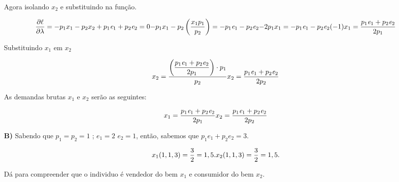\begin{flushleft}
\begin{center}
Agora isolando $x_{2}$ e substituindo na função.
\end{center}

\begin{equation}
\frac{\partial\ell}{\partial \lambda} = -p_{1}x_{1} - p_{2}x_{2} + p_{1}\textit{e}_{1} + p_{2}\textit{e}_{2} = 0
$$\\$$
-p_{1}x_{1} - p_{2}\left(\dfrac{x_{1}p_{1}}{p_{2}}\right) = -p_{1}\textit{e}_{1} - p_{2}\textit{e}_{2}
$$\\$$
-2p_{1}x_{1} = -p_{1}\textit{e}_{1} - p_{2}\textit{e}_{2} (-1)
$$\\$$
x_{1} = \dfrac{p_{1}\textit{e}_{1} + p_{2}\textit{e}_{2}}{2p_{1}}
\end{equation}

\begin{center}
Substituindo $x_{1}$ em $x_{2}$
\end{center}

\begin{equation}
x_{2} = \dfrac{\left( \dfrac{p_{1}\textit{e}_{1} + p_{2}\textit{e}_{2}}{2p_{1}}\right)\cdot p_{1}}{p_{2}}
$$\\$$
x_{2} = \dfrac{p_{1}\textit{e}_{1} + p_{2}\textit{e}_{2}}{2p_{2}}
\end{equation}

\begin{center}
As demandas brutas $x_{1}$ e $x_{2}$ serão as seguintes:

\begin{equation}
x_{1} = \dfrac{p_{1}\textit{e}_{1} + p_{2}\textit{e}_{2}}{2p_{1}}
$$\\$$
x_{2} = \dfrac{p_{1}\textit{e}_{1} + p_{2}\textit{e}_{2}}{2p_{2}}
\end{equation}

\end{center}

\singlespacing

\textbf{B)} Sabendo que $p_{1} = p_{2} = 1$ ; $\textit{e}_{1} = 2$  $\textit{e}_{2} = 1$, então, sabemos que $p_{1}\textit{e}_{1} + p_{2}\textit{e}_{2} = 3$.

\begin{equation}
x_{1}(1,1,3) = \dfrac{3}{2} = 1,5.
$$\\$$
x_{2}(1,1,3) = \dfrac{3}{2} = 1,5.
\end{equation}

\begin{center}
Dá para compreender que o individuo é vendedor do bem $x_{1}$ e consumidor do bem $x_{2}$.
\end{center}


\end{flushleft}
